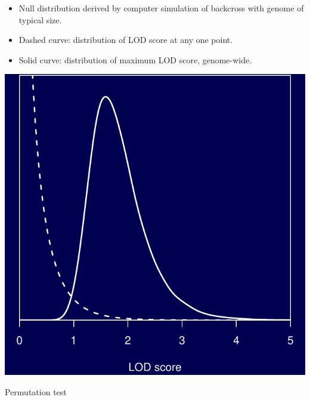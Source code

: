 \documentclass[12pt]{article}
\newcommand{\headsize}{\fontsize{35}{35} \selectfont}
\newcommand{\smallersize}{\fontsize{20}{25} \selectfont}
\begin{document}
\hspace*{0.5in}
\begin{minipage}[t]{4.7in}
\vspace*{10mm}

\color{mywhite} \smallersize
\begin{itemize}
\setlength{\rightskip}{0pt plus 1fil} %
\item Null distribution derived by computer simulation of backcross
with genome of typical size.
\item Dashed curve: distribution of LOD score at any one point.
\item Solid curve: distribution of maximum LOD score, genome-wide.
\end{itemize}
\end{minipage}
\hfill
\begin{minipage}[t]{4.7in}
\vspace*{0cm}

\includegraphics{Figs/loddist.pdf}
\end{minipage}








\newpage

\headsize \color{myyellow}
\hfill \begin{minipage}{5.75in}
\centering
Permutation test
\end{minipage}
\end{document}
